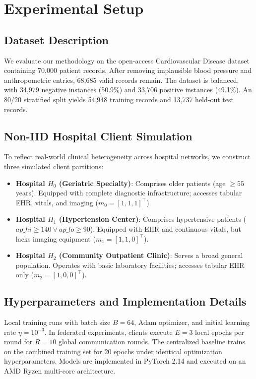 \documentclass[10pt,conference]{IEEEtran}
\begin{document}
\section{Experimental Setup}

\subsection{Dataset Description}
We evaluate our methodology on the open-access Cardiovascular Disease dataset containing 70,000 patient records. After removing implausible blood pressure and anthropometric entries, 68,685 valid records remain. The dataset is balanced, with 34,979 negative instances (50.9\%) and 33,706 positive instances (49.1\%). An 80/20 stratified split yields 54,948 training records and 13,737 held-out test records.

\subsection{Non-IID Hospital Client Simulation}
To reflect real-world clinical heterogeneity across hospital networks, we construct three simulated client partitions:
\begin{itemize}
    \item \textbf{Hospital $H_0$ (Geriatric Specialty)}: Comprises older patients (age $\ge 55$ years). Equipped with complete diagnostic infrastructure; accesses tabular EHR, vitals, and imaging ($m_0 = [1, 1, 1]^\top$).
    \item \textbf{Hospital $H_1$ (Hypertension Center)}: Comprises hypertensive patients ($ap\_hi \ge 140 \lor ap\_lo \ge 90$). Equipped with EHR and continuous vitals, but lacks imaging equipment ($m_1 = [1, 1, 0]^\top$).
    \item \textbf{Hospital $H_2$ (Community Outpatient Clinic)}: Serves a broad general population. Operates with basic laboratory facilities; accesses tabular EHR only ($m_2 = [1, 0, 0]^\top$).
\end{itemize}

\subsection{Hyperparameters and Implementation Details}
Local training runs with batch size $B=64$, Adam optimizer, and initial learning rate $\eta = 10^{-3}$. In federated experiments, clients execute $E=3$ local epochs per round for $R=10$ global communication rounds. The centralized baseline trains on the combined training set for 20 epochs under identical optimization hyperparameters. Models are implemented in PyTorch 2.14 and executed on an AMD Ryzen multi-core architecture.
\end{document}
